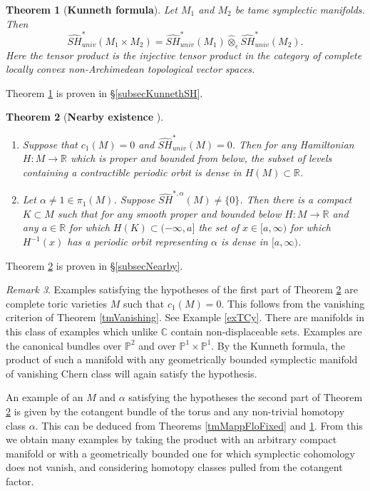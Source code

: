 \documentclass[11pt]{amsart}
\newcommand{\R}{\mathbb{R}}
\newcommand{\C}{\mathbb{C}}
\newcommand{\Pp}{\mathbb{P}}
\newtheorem{tm}{Theorem}[section]
\theoremstyle{definition}
\theoremstyle{remark}
\newtheorem{rem}[tm]{Remark}
\begin{document}
\begin{tm}[\textbf{Kunneth formula}]\label{tmKunneth}
Let $M_1$ and $M_2$ be tame symplectic manifolds. Then
\begin{equation}\label{eqKunnethSH}
\widehat{SH}_{univ}^*(M_1\times M_2)=\widehat{SH}_{univ}^*(M_1)\hat{\otimes}_\epsilon\widehat{SH}_{univ}^*(M_2).
\end{equation}
Here the tensor product is the injective tensor product in the category of complete locally convex non-Archimedean topological vector spaces.
\end{tm}
Theorem \ref{tmKunneth} is proven in \S \ref{subsecKunnethSH}.
\begin{tm}[\textbf{Nearby existence }]\label{tmNearbyEx0}
\begin{enumerate}
\item\label{NearbyEx1} Suppose that $c_1(M)=0$ and $\widehat{SH}_{univ}^*(M)=0$. Then for any Hamiltonian $H:M\to\R$ which is proper and bounded from below, the subset of levels containing a contractible periodic orbit is dense in $H(M)\subset\R$.
\item\label{NearbyEx2} Let $\alpha\neq 1\in\pi_1(M)$. Suppose $\widehat{SH}^{*,\alpha}(M)\neq\{0\}$. Then there is a compact $K\subset M$ such that for any smooth proper and bounded below $H:M\to\R$ and any $a\in \R$ for which  $H(K)\subset(-\infty,a]$ the set of $x\in[a,\infty)$ for which $H^{-1}(x)$ has a periodic orbit representing $\alpha$ is dense in $[a,\infty)$.
\end{enumerate}
\end{tm}
Theorem \ref{tmNearbyEx0} is proven in \S\ref{subsecNearby}.
\begin{rem}
Examples satisfying the hypotheses of the first part of Theorem \ref{tmNearbyEx0} are complete toric varieties $M$ such that $c_1(M)=0$. This follows from the vanishing criterion of Theorem \ref{tmVanishing}. See Example \ref{exTCy}. There are manifolds in this class of examples which unlike $\C$ contain non-displaceable sets. Examples are the canonical bundles over $\Pp^2$ and over $\Pp^1\times \Pp^1$. By the Kunneth formula, the product of such a manifold with any geometrically bounded symplectic manifold of vanishing Chern class will again satisfy the hypothesis.

An example of an $M$ and $\alpha$ satisfying the hypotheses the second part of Theorem \ref{tmNearbyEx0} is given by the cotangent bundle of the torus and any non-trivial homotopy class $\alpha$. This can be deduced from Theorems \ref{tmMappFloFixed} and \ref{tmKunneth}. From this  we obtain many examples by taking the product with an arbitrary compact manifold or with a geometrically bounded one for which symplectic cohomology does not vanish, and considering homotopy classes pulled from the cotangent factor.
\end{rem}
\end{document}

